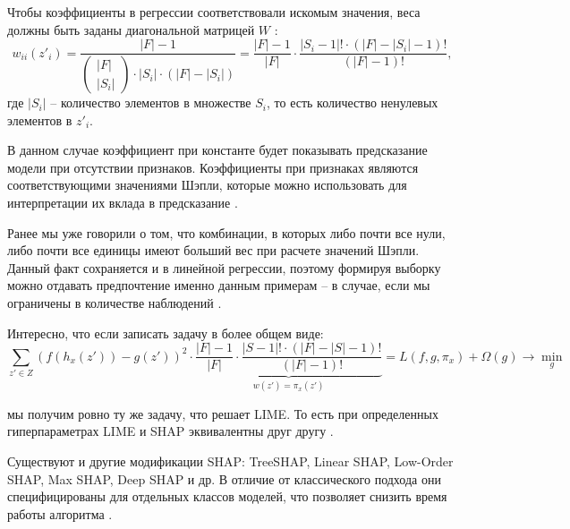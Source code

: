 Чтобы коэффициенты в регрессии соответствовали искомым значения, веса должны быть заданы диагональной матрицей $W$ \cite{shap}: 
\[w_{ii}(z'_i) = \frac{|F|-1}{
	\begin{pmatrix}
	|F| \\
	|S_i|
	\end{pmatrix} \cdot |S_i| \cdot (|F| - |S_i|)} = \frac{|F|-1}{|F|} \cdot \frac{|S_i - 1|! \cdot (|F|-|S_i|-1)!}{(|F|-1)!},
\]
где $|S_i|$ -- количество элементов в множестве $S_i$, то есть количество ненулевых элементов в $z'_i$.

В данном случае коэффициент при константе будет показывать предсказание модели при отсутствии признаков. Коэффициенты при признаках являются соответствующими значениями Шэпли, %
которые можно использовать для интерпретации их вклада в предсказание \cite{basis}.

Ранее мы уже говорили о том, что комбинации, в которых либо почти все нули, либо почти все единицы имеют больший вес при расчете значений Шэпли. Данный факт сохраняется и в линейной регрессии, поэтому формируя выборку можно отдавать предпочтение именно данным примерам -- в случае, если мы ограничены в количестве наблюдений \cite{basis}.

Интересно, что если записать задачу в более общем виде:
\[
\sum\limits_{z' \in Z} (f(h_x(z')) - g(z'))^2 \cdot \underbrace{\frac{|F|-1}{|F|} \cdot \frac{|S - 1|! \cdot (|F|-|S|-1)!}{(|F|-1)!}}_{w(z') = \pi_x(z')} = L(f, g, \pi_x) + \Omega(g) \rightarrow \min_g
\]
\vspace{-4mm}

мы получим ровно ту же задачу, что решает LIME. То есть при определенных гиперпараметрах LIME и SHAP эквивалентны друг другу \cite{shap}.

Существуют и другие модификации SHAP: TreeSHAP, Linear SHAP, Low-Order SHAP, Max SHAP, Deep SHAP и др. В отличие от классического подхода они специфицированы для отдельных классов моделей, что позволяет снизить время работы алгоритма \cite{basis, shap}.